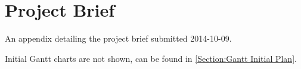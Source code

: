 \chapter{Project Brief} \label{Chapter:Project Brief}

\begin{preamble}
	An appendix detailing the project brief submitted 2014-10-09.
\end{preamble}

\begin{center}
	\vspace{-10pt}
\end{center}

Initial Gantt charts are not shown, can be found in \autoref{Section:Gantt Initial Plan}.

